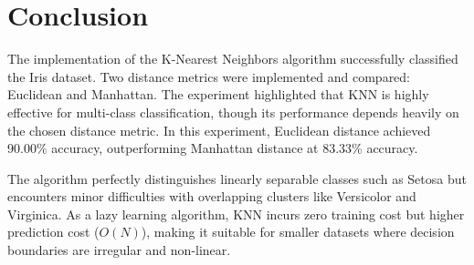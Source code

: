 \documentclass[11pt]{article}
\begin{document}
\section{Conclusion}
The implementation of the K-Nearest Neighbors algorithm successfully classified the Iris dataset. Two distance metrics were implemented and compared: Euclidean and Manhattan. The experiment highlighted that KNN is highly effective for multi-class classification, though its performance depends heavily on the chosen distance metric. In this experiment, Euclidean distance achieved 90.00\% accuracy, outperforming Manhattan distance at 83.33\% accuracy.

The algorithm perfectly distinguishes linearly separable classes such as Setosa but encounters minor difficulties with overlapping clusters like Versicolor and Virginica. As a lazy learning algorithm, KNN incurs zero training cost but higher prediction cost ($O(N)$), making it suitable for smaller datasets where decision boundaries are irregular and non-linear.


\renewcommand{\bibname}{References}

\end{document}
